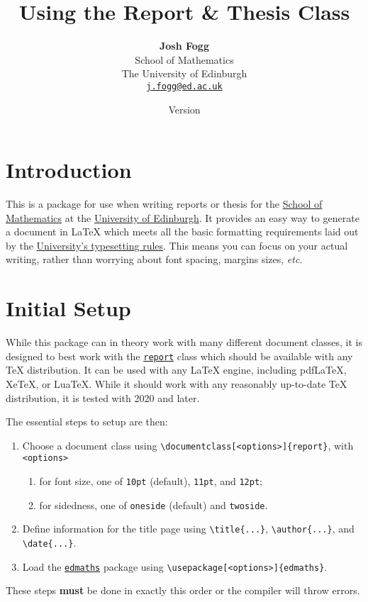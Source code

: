 \documentclass[12pt]{article}
\title{\textbf{Using the \pkg{edmaths} Report \& Thesis Class}}
\author{\textbf{Josh Fogg}\\School of Mathematics\\The University of Edinburgh\\\texttt{\href{mailto:j.fogg@ed.ac.uk}{j.fogg@ed.ac.uk}}}
\date{Version \msuversion\\\msudate}
\newcommand\pkg[1]{\href{https://www.ctan.org/pkg/#1}{\color{teal}\lstinline{#1}}}
\newcommand\key[1]{{\color{orange}\lstinline|#1|}}
\begin{document}
\maketitle
\thispagestyle{empty}

\section{Introduction}

This is a package for use when writing reports or thesis for the \href{https://www.maths.ed.ac.uk/}{School of Mathematics} at the \href{https://www.ed.ac.uk/}{University of Edinburgh}.  It provides an easy way to generate a document in \LaTeX{} which meets all the basic formatting requirements laid out by the \href{https://www.ed.ac.uk/academic-services/students/thesis-submission}{University's typesetting rules}. This means you can focus on your actual writing, rather than worrying about font spacing, margins sizes, {\it etc}.

\section{Initial Setup}

While this package can in theory work with many different document classes, it is designed to best work with the \pkg{report} class which should be available with any \TeX{} distribution. It can be used with any \LaTeX{} engine, including pdfLaTeX, XeTeX, or LuaTeX. While it should work with any reasonably up-to-date TeX distribution, it is tested with 2020 and later.

The essential steps to setup are then:
\begin{enumerate}
	\item Choose a document class using \lstinline|\documentclass[<options>]{report}|, with \key{<options>}
		\begin{enumerate}
			\item for font size, one of \key{10pt} (default), \key{11pt}, and \key{12pt};
			\item for sidedness, one of \key{oneside} (default) and \key{twoside}.
		\end{enumerate}
	\item Define information for the title page using \lstinline|\title{...}|, \lstinline|\author{...}|, and \lstinline|\date{...}|.
	\item Load the \pkg{edmaths} package using \lstinline|\usepackage[<options>]{edmaths}|.
\end{enumerate}
These steps {\bf must} be done in exactly this order or the compiler will throw errors.
\end{document}
